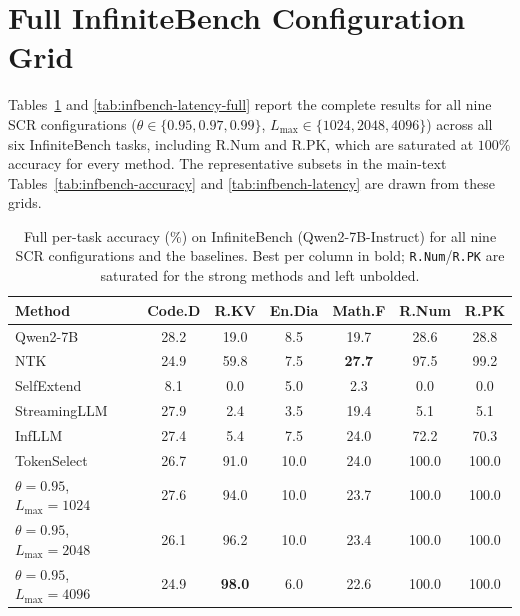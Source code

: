 \documentclass[10pt,conference]{IEEEtran}
\begin{document}
\appendix
\section{Full InfiniteBench Configuration Grid}
\label{app:infbench-full}

Tables~\ref{tab:infbench-accuracy-full} and
\ref{tab:infbench-latency-full} report the complete results for all nine
SCR configurations ($\theta\in\{0.95,0.97,0.99\}$,
$L_{\max}\in\{1024,2048,4096\}$) across all six InfiniteBench tasks,
including R.Num and R.PK, which are
saturated at $100\%$ accuracy for every method. The representative
subsets in the main-text Tables~\ref{tab:infbench-accuracy} and
\ref{tab:infbench-latency} are drawn from these grids.

\begin{table}[t]
\centering
\caption{Full per-task accuracy (\%) on InfiniteBench (Qwen2-7B-Instruct)
for all nine SCR configurations and the baselines. Best per column in
bold; \texttt{R.Num}/\texttt{R.PK} are saturated for the strong methods
and left unbolded.}
\label{tab:infbench-accuracy-full}
\small
\begin{tabular}{lcccccc}
\toprule
\textbf{Method} & \textbf{Code.D} & \textbf{R.KV} & \textbf{En.Dia} & \textbf{Math.F} & \textbf{R.Num} & \textbf{R.PK} \\
\midrule
Qwen2-7B~\cite{yang2024qwen2}          & 28.2 & 19.0 & \phantom{0}8.5 & 19.7 & 28.6 & 28.8 \\
NTK~\cite{ntk2023web}                  & 24.9 & 59.8 & \phantom{0}7.5 & \textbf{27.7} & 97.5 & 99.2 \\
SelfExtend~\cite{jin2024selfextend}    & \phantom{0}8.1 & \phantom{0}0.0 & \phantom{0}5.0 & \phantom{0}2.3 & \phantom{0}0.0 & \phantom{0}0.0 \\
StreamingLLM~\cite{xiao2024efficient}  & 27.9 & \phantom{0}2.4 & \phantom{0}3.5 & 19.4 & \phantom{0}5.1 & \phantom{0}5.1 \\
InfLLM~\cite{xiao2024infllm}           & 27.4 & \phantom{0}5.4 & \phantom{0}7.5 & 24.0 & 72.2 & 70.3 \\
TokenSelect~\cite{tokenselect2025}     & 26.7 & 91.0 & 10.0 & 24.0 & 100.0 & 100.0 \\
\midrule
$\theta\!=\!0.95$, $L_{\max}\!=\!1024$      & 27.6 & 94.0 & 10.0 & 23.7 & 100.0 & 100.0 \\
$\theta\!=\!0.95$, $L_{\max}\!=\!2048$      & 26.1 & 96.2 & 10.0 & 23.4 & 100.0 & 100.0 \\
$\theta\!=\!0.95$, $L_{\max}\!=\!4096$      & 24.9 & \textbf{98.0} & \phantom{0}6.0 & 22.6 & 100.0 & 100.0 \\

\end{tabular}
\end{table}
\end{document}
